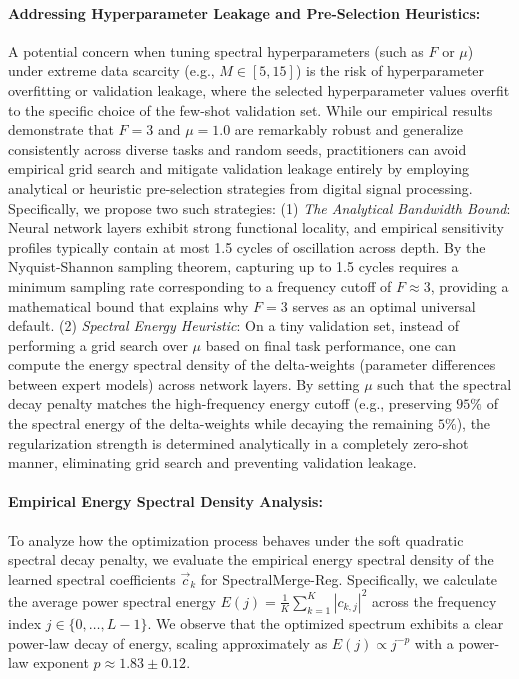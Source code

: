 \documentclass{article}
\theoremstyle{plain}
\theoremstyle{definition}
\theoremstyle{remark}
\begin{document}
\paragraph{Addressing Hyperparameter Leakage and Pre-Selection Heuristics:} A potential concern when tuning spectral hyperparameters (such as $F$ or $\mu$) under extreme data scarcity (e.g., $M \in [5, 15]$) is the risk of hyperparameter overfitting or validation leakage, where the selected hyperparameter values overfit to the specific choice of the few-shot validation set. While our empirical results demonstrate that $F=3$ and $\mu=1.0$ are remarkably robust and generalize consistently across diverse tasks and random seeds, practitioners can avoid empirical grid search and mitigate validation leakage entirely by employing analytical or heuristic pre-selection strategies from digital signal processing. Specifically, we propose two such strategies: (1) \emph{The Analytical Bandwidth Bound}: Neural network layers exhibit strong functional locality, and empirical sensitivity profiles typically contain at most 1.5 cycles of oscillation across depth. By the Nyquist-Shannon sampling theorem, capturing up to 1.5 cycles requires a minimum sampling rate corresponding to a frequency cutoff of $F \approx 3$, providing a mathematical bound that explains why $F=3$ serves as an optimal universal default. (2) \emph{Spectral Energy Heuristic}: On a tiny validation set, instead of performing a grid search over $\mu$ based on final task performance, one can compute the energy spectral density of the delta-weights (parameter differences between expert models) across network layers. By setting $\mu$ such that the spectral decay penalty matches the high-frequency energy cutoff (e.g., preserving $95\%$ of the spectral energy of the delta-weights while decaying the remaining $5\%$), the regularization strength is determined analytically in a completely zero-shot manner, eliminating grid search and preventing validation leakage.

\paragraph{Empirical Energy Spectral Density Analysis:}
To analyze how the optimization process behaves under the soft quadratic spectral decay penalty, we evaluate the empirical energy spectral density of the learned spectral coefficients $\vec{c}_k$ for SpectralMerge-Reg. Specifically, we calculate the average power spectral energy $E(j) = \frac{1}{K} \sum_{k=1}^K |c_{k,j}|^2$ across the frequency index $j \in \{0, \dots, L-1\}$. We observe that the optimized spectrum exhibits a clear power-law decay of energy, scaling approximately as $E(j) \propto j^{-p}$ with a power-law exponent $p \approx 1.83 \pm 0.12$. 
\end{document}
